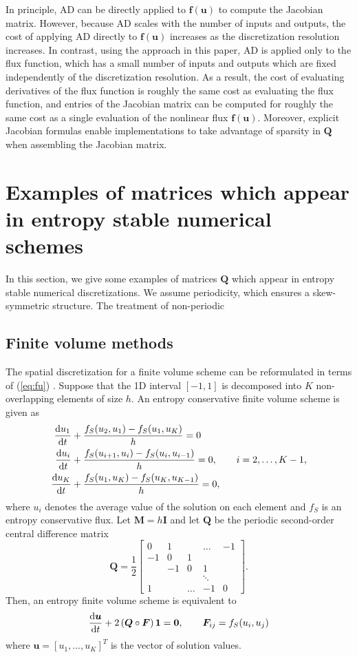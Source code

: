 \documentclass{article}
\newcommand{\td}[2]{\frac{{\rm d}#1}{{\rm d}{ {#2}}}}
\newcommand{\LRp}[1]{\left( #1 \right)}
\newcommand{\LRs}[1]{\left[ #1 \right]}
\newcommand{\eq}[1]{\begin{align*}#1\end{align*}}
\begin{document}
In principle, AD can be directly applied to $\bm{f}(\bm{u})$ to compute the Jacobian matrix.  However, because AD scales with the number of inputs and outputs, the cost of applying AD directly to $\bm{f}(\bm{u})$ increases as the discretization resolution increases.  In contrast, using the approach in this paper, AD is applied only to the flux function, which has a small number of inputs and outputs which are fixed independently of the discretization resolution.  As a result, the cost of evaluating derivatives of the flux function is roughly the same cost as evaluating the flux function, and entries of the Jacobian matrix can be computed for roughly the same cost as a single evaluation of the nonlinear flux $\bm{f}(\bm{u})$.  Moreover, explicit Jacobian formulas enable implementations to take advantage of sparsity in $\bm{Q}$ when assembling the Jacobian matrix.  

\section{Examples of matrices which appear in entropy stable numerical schemes}

In this section, we give some examples of matrices $\bm{Q}$ which appear in entropy stable numerical discretizations.  We assume periodicity, which ensures a skew-symmetric structure.  The treatment of non-periodic

\subsection{Finite volume methods}

The spatial discretization for a finite volume scheme can be reformulated in terms of (\ref{eq:fu}) \cite{chan2019entropy}.  Suppose that the 1D interval $[-1,1]$ is decomposed into $K$ non-overlapping elements of size $h$.  An entropy conservative finite volume scheme is given as
\eq{
\td{u_1}{t} &+ \frac{f_S(u_{2},u_1) - f_S(u_1,u_{K})}{h} = 0\\
\td{u_i}{t} &+ \frac{f_S(u_{i+1},u_i) - f_S(u_i,u_{i-1})}{h} = 0, \qquad i = 2,\ldots, K-1,\\
\td{u_K}{t} &+ \frac{f_S(u_{1},u_K) - f_S(u_K,u_{K-1})}{h} = 0,
}
where $u_i$ denotes the average value of the solution on each element and $f_S$ is an entropy conservative flux.  Let $\bm{M} = h\bm{I}$ and let $\bm{Q}$ be the periodic second-order central difference matrix
\[
\bm{Q} = \frac{1}{2}\begin{bmatrix}
0 & 1 & &\ldots & -1\\
-1 & 0 & 1 &&  \\
& -1 & 0 & 1 &  \\
 & & & \ddots &  \\
1 & &\ldots  & -1 & 0
\end{bmatrix}.
\]
Then, an entropy finite volume scheme is equivalent to 
\[
\td{\bm{u}}{t} + 2\LRp{\bm{Q}\circ\bm{F}}\bm{1} = \bm{0}, \qquad \bm{F}_{ij} = f_S(u_i,u_j)
\]
where $\bm{u} = \LRs{u_1,\ldots, u_K}^T$ is the vector of solution values.  
\end{document}
